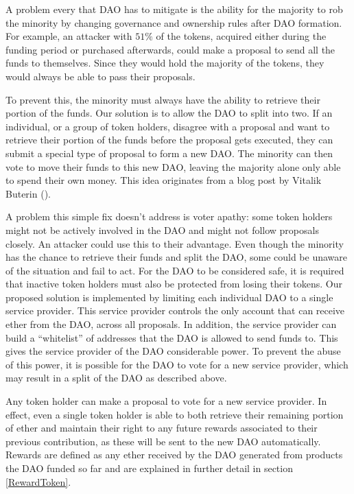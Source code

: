 \documentclass[9pt,oneside]{amsart}
\begin{document}
\begin{multicols}{2}
A problem every that DAO has to mitigate is the ability for the majority to rob the minority by changing governance and ownership rules after DAO formation.  For example, an attacker with $51\%$ of the tokens, acquired either during the funding period or purchased afterwards, could make a proposal to send all the funds to themselves. Since they would hold the majority of the tokens, they would always be able to pass their proposals.

To prevent this, the minority must always have the ability to retrieve their portion of the funds.  Our solution is to allow the DAO to split into two. If an individual, or a group of token holders, disagree with a proposal and want to retrieve their portion of the funds before the proposal gets executed, they can submit a special type of proposal to form a new DAO. The minority can then vote to move their funds to this new DAO, leaving the majority alone only able to spend their own money.
This idea originates from a blog post by Vitalik Buterin (\cite{Vitalik2015subjectivity}). 

A problem this simple fix doesn't address is voter apathy: some token holders might not be actively involved in the DAO and might not follow proposals closely. An attacker could use this to their advantage. Even though the minority has the chance to retrieve their funds and split the DAO, some could be unaware of the situation and fail to act. For the DAO to be considered safe, it is required that inactive token holders must also be protected from losing their tokens. Our proposed solution is implemented by limiting each individual DAO to a single service provider. This service provider controls the only account that can receive ether from the DAO, across all proposals. In addition, the service provider can build a “whitelist” of addresses that the DAO is allowed to send funds to. This gives the service provider of the DAO considerable power. To prevent the abuse of this power, it is possible for the DAO to vote for a new service provider, which may result in a split of the DAO as described above. 

Any token holder can make a proposal to vote for a new service provider. In effect, even a single token holder is able to both retrieve their remaining portion of ether and maintain their right to any future rewards associated to their previous contribution, as these will be sent to the new DAO automatically. Rewards are defined as any ether received by the DAO generated from products the DAO funded so far and are explained in further detail in section \ref{RewardToken}.


\end{multicols}
\end{document}
